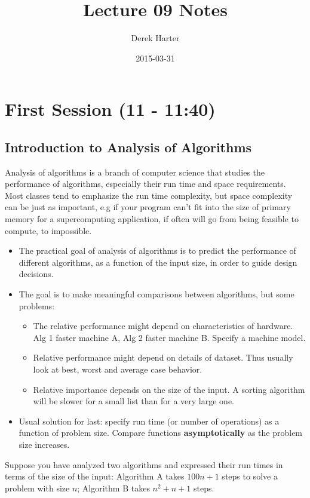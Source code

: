 \documentclass[11pt]{article}
\title{Lecture 09 Notes}
\author{Derek Harter}
\date{2015-03-31}
\begin{document}
\maketitle


\section{First Session (11 - 11:40)}
\label{sec-1}
\subsection{Introduction to Analysis of Algorithms}
\label{sec-1-1}

Analysis of algorithms is a branch of computer science that studies
the performance of algorithms, especially their run time and space
requirements.  Most classes tend to emphasize the run time complexity,
but space complexity can be just as important, e.g if your program
can't fit into the size of primary memory for a supercomputing
application, if often will go from being feasible to compute, to
impossible.

\begin{itemize}
\item The practical goal of analysis of algorithms is to predict the
  performance of different algorithms, as a function of the input size,
  in order to guide design decisions.
\item The goal is to make meaningful comparisons between algorithms, but
  some problems:
\begin{itemize}
\item The relative performance might depend on characteristics of hardware.
    Alg 1 faster machine A, Alg 2 faster machine B.  Specify a machine model.
\item Relative performance might depend on details of dataset.  Thus usually
    look at best, worst and average case behavior.
\item Relative importance depends on the size of the input.  A sorting
    algorithm will be slower for a small list than for a very large one.
\end{itemize}
\item Usual solution for last: specify run time (or number of operations)
  as a function of problem size.  Compare functions \textbf{asymptotically} 
  as the problem size increases.
\end{itemize}

Suppose you have analyzed two algorithms and expressed their run times in
terms of the size of the input: Algorithm A takes $100n + 1$ steps
to solve a problem with size $n$; Algorithm B takes $n^2 + n + 1$ steps.
\end{document}
